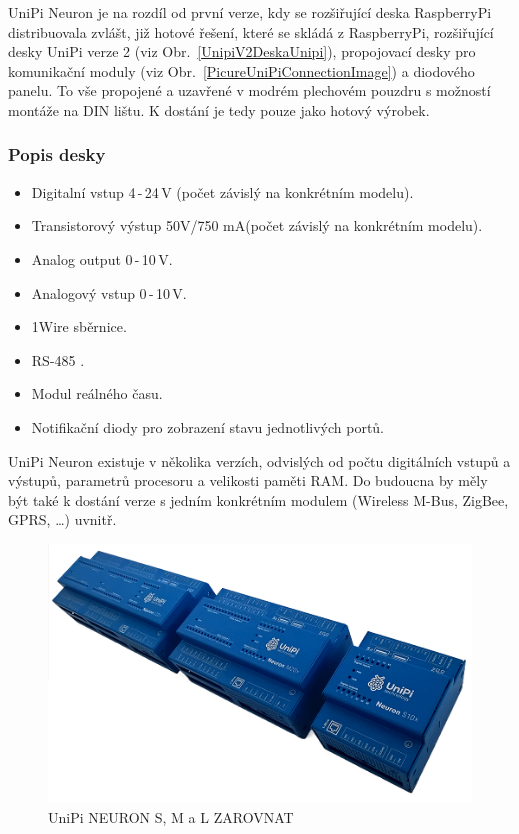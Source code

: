 UniPi Neuron je na rozdíl od první verze, kdy se rozšiřující deska RaspberryPi distribuovala zvlášt, již hotové řešení, které se skládá z RaspberryPi, rozšiřující desky UniPi verze 2 (viz Obr.~\ref{UnipiV2DeskaUnipi}), propojovací desky pro komunikační moduly (viz Obr.~\ref{PicureUniPiConnectionImage}) a diodového panelu. To vše propojené a uzavřené v modrém plechovém pouzdru s možností montáže na DIN lištu. K dostání je tedy pouze jako hotový výrobek.


\subsubsection{Popis desky}
\begin{itemize}
\item Digitalní vstup 4\,-\,24\,V (počet závislý na konkrétním modelu).
\item Transistorový výstup 50V/750 mA(počet závislý na konkrétním modelu).
\item Analog output 0\,-\,10\,V.
\item Analogový vstup 0\,-\,10\,V.
\item 1Wire sběrnice.
\item RS-485 .
\item Modul reálného času.
\item Notifikační diody pro zobrazení stavu jednotlivých portů.
\end{itemize}

UniPi Neuron existuje v několika verzích, odvislých od počtu digitálních vstupů a výstupů, parametrů procesoru a velikosti paměti RAM. Do budoucna by měly být také k dostání verze s jedním konkrétním modulem (Wireless M-Bus, ZigBee, GPRS, \ldots) uvnitř.

\newpage

 \begin{figure}[!h]
  \begin{center}
    \includegraphics[scale=1.05]{obrazky/unipi_unipi_verze}
  \end{center}
  \caption{UniPi NEURON S, M a L  \cite{UniPiBoard2}   \colorbox[rgb]{1,0,0}{ZAROVNAT}}
\end{figure}



